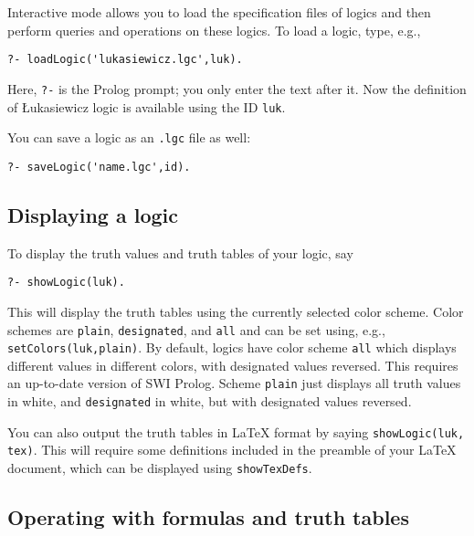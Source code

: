 \documentclass[
]{article}
\newcommand{\passthrough}[1]{#1}
\begin{document}
Interactive mode allows you to load the specification files of logics
and then perform queries and operations on these logics. To load a
logic, type, e.g.,

\begin{lstlisting}
?- loadLogic('lukasiewicz.lgc',luk).
\end{lstlisting}

Here, \passthrough{\lstinline!?-!} is the Prolog prompt; you only enter
the text after it. Now the definition of Łukasiewicz logic is available
using the ID \passthrough{\lstinline!luk!}.

You can save a logic as an \passthrough{\lstinline!.lgc!} file as well:

\begin{lstlisting}
?- saveLogic('name.lgc',id).
\end{lstlisting}

\hypertarget{displaying-a-logic}{%
\subsection{Displaying a logic}\label{displaying-a-logic}}

To display the truth values and truth tables of your logic, say

\begin{lstlisting}
?- showLogic(luk).
\end{lstlisting}

This will display the truth tables using the currently selected color
scheme. Color schemes are \passthrough{\lstinline!plain!},
\passthrough{\lstinline!designated!}, and \passthrough{\lstinline!all!}
and can be set using, e.g.,
\passthrough{\lstinline!setColors(luk,plain)!}. By default, logics have
color scheme \passthrough{\lstinline!all!} which displays different
values in different colors, with designated values reversed. This
requires an up-to-date version of SWI Prolog. Scheme
\passthrough{\lstinline!plain!} just displays all truth values in white,
and \passthrough{\lstinline!designated!} in white, but with designated
values reversed.

You can also output the truth tables in LaTeX format by saying
\passthrough{\lstinline!showLogic(luk, tex)!}. This will require some
definitions included in the preamble of your LaTeX document, which can
be displayed using \passthrough{\lstinline!showTexDefs!}.

\hypertarget{operating-with-formulas-and-truth-tables}{%
\subsection{Operating with formulas and truth
tables}\label{operating-with-formulas-and-truth-tables}}
\end{document}
